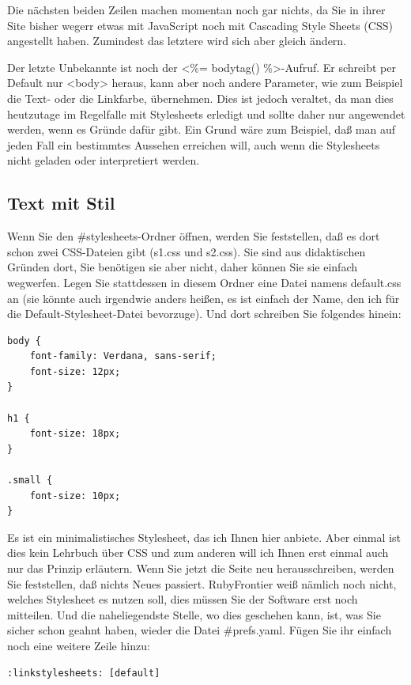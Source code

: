 \documentclass[11pt]{report}
\begin{document}
Die nächsten beiden Zeilen machen momentan noch gar nichts, da Sie in
ihrer Site bisher wegerr etwas mit JavaScript noch mit Cascading Style
Sheets (CSS) angestellt haben. Zumindest das letztere wird sich aber
gleich ändern.

Der letzte Unbekannte ist noch der <\%= bodytag() \%>-Aufruf. Er
schreibt per Default nur <body> heraus, kann aber noch andere
Parameter, wie zum Beispiel die Text- oder die Linkfarbe,
übernehmen. Dies ist jedoch veraltet, da man dies heutzutage im
Regelfalle mit Stylesheets erledigt und sollte daher nur angewendet
werden, wenn es Gründe dafür gibt. Ein Grund wäre zum Beispiel, daß
man auf jeden Fall ein bestimmtes Aussehen erreichen will, auch wenn
die Stylesheets nicht geladen oder interpretiert werden.
\subsection{Text mit Stil}
\label{sec-2-1-1-2}


Wenn Sie den \#stylesheets-Ordner öffnen, werden Sie feststellen, daß
es dort schon zwei CSS-Dateien gibt (s1.css und s2.css). Sie sind aus
didaktischen Gründen dort, Sie benötigen sie aber nicht, daher können
Sie sie einfach wegwerfen. Legen Sie stattdessen in diesem Ordner eine
Datei namens default.css an (sie könnte auch irgendwie anders heißen,
es ist einfach der Name, den ich für die Default-Stylesheet-Datei
bevorzuge). Und dort schreiben Sie folgendes hinein:


\begin{verbatim}
body {
    font-family: Verdana, sans-serif;
    font-size: 12px;
}

h1 {
    font-size: 18px;
}

.small {
    font-size: 10px;
}
\end{verbatim}

Es ist ein minimalistisches Stylesheet, das ich Ihnen hier
anbiete. Aber einmal ist dies kein Lehrbuch über CSS und zum anderen
will ich Ihnen erst einmal auch nur das Prinzip erläutern. Wenn Sie
jetzt die Seite neu herausschreiben, werden Sie feststellen, daß
nichts Neues passiert. RubyFrontier weiß nämlich noch nicht, welches
Stylesheet es nutzen soll, dies müssen Sie der Software erst noch
mitteilen. Und die naheliegendste Stelle, wo dies geschehen kann, ist,
was Sie sicher schon geahnt haben, wieder die Datei \#prefs.yaml. Fügen
Sie ihr einfach noch eine weitere Zeile hinzu:


\begin{verbatim}
:linkstylesheets: [default]
\end{verbatim}
\end{document}
